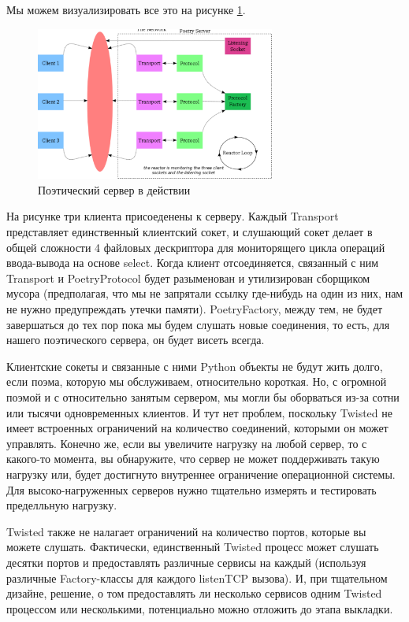 Мы можем визуализировать все это на рисунке \ref{fig:server-1}.

\begin{figure}[h]
\begin{center}
    \includegraphics[width=0.7\textwidth]{images/server-1.pdf}
    \caption{Поэтический сервер в действии\label{fig:server-1}}
\end{center}
\end{figure}


На рисунке три клиента присоеденены к серверу. Каждый 
Transport представляет единственный клиентский сокет, и 
слушающий сокет делает в общей сложности 4 файловых дескриптора 
для мониторящего цикла операций ввода-вывода на  
основе select. Когда клиент отсоединяется, связанный с ним 
Transport и PoetryProtocol будет разыменован и утилизирован 
сборщиком мусора (предполагая, что мы не запрятали ссылку 
где-нибудь на один из них, нам не нужно 
предупреждать утечки памяти). PoetryFactory, между тем, не будет 
завершаться до тех пор пока мы будем слушать новые соединения, 
то есть, для нашего поэтического сервера, он будет висеть всегда. 


Клиентские сокеты и связанные с ними Python объекты не будут жить 
долго, если поэма, которую мы обслуживаем, относительно короткая. 
Но, с огромной поэмой и с относительно занятым сервером, мы могли 
бы оборваться из-за сотни или тысячи одновременных 
клиентов. И тут нет проблем, поскольку Twisted не имеет 
встроенных ограничений на количество соединений, которыми он 
может управлять. Конечно же, если вы увеличите нагрузку на 
любой сервер, то с какого-то момента, вы обнаружите, что 
сервер не может поддерживать такую нагрузку или, будет 
достигнуто внутреннее ограничение операционной системы. Для 
высоко-нагруженных серверов нужно тщательно измерять и тестировать пределльную нагрузку.


Twisted также не налагает ограничений на количество портов, 
которые вы можете слушать. Фактически, единственный Twisted процесс 
может слушать десятки портов и предоставлять различные сервисы на 
каждый (используя различные Factory-классы для каждого listenTCP вызова). 
И, при тщательном дизайне, решение, о том предоставлять ли несколько сервисов 
одним Twisted процессом или несколькими, 
потенциально можно отложить до этапа выкладки.


